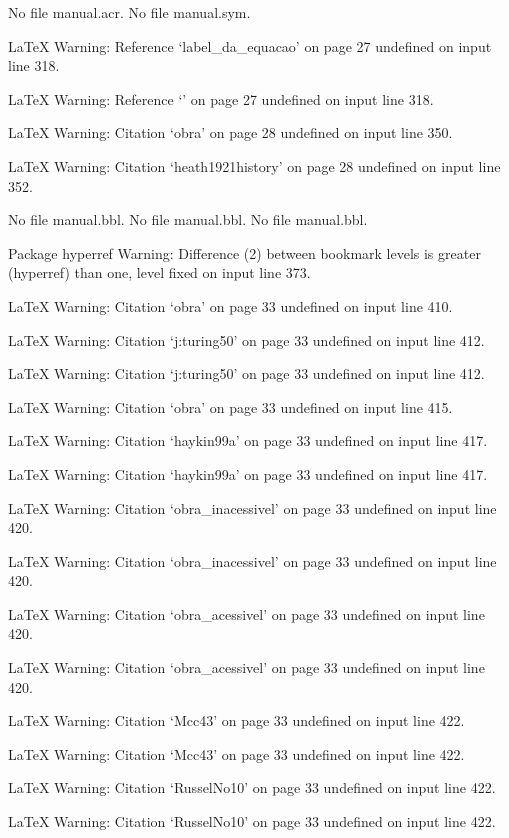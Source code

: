 





No file manual.acr.
No file manual.sym.



LaTeX Warning: Reference `label_da_equacao' on page 27 undefined on input line 318.


LaTeX Warning: Reference `' on page 27 undefined on input line 318.


LaTeX Warning: Citation `obra' on page 28 undefined on input line 350.


LaTeX Warning: Citation `heath1921history' on page 28 undefined on input line 352.

No file manual.bbl.
No file manual.bbl.
No file manual.bbl.

Package hyperref Warning: Difference (2) between bookmark levels is greater 
(hyperref)                than one, level fixed on input line 373.


LaTeX Warning: Citation `obra' on page 33 undefined on input line 410.


LaTeX Warning: Citation `j:turing50' on page 33 undefined on input line 412.


LaTeX Warning: Citation `j:turing50' on page 33 undefined on input line 412.


LaTeX Warning: Citation `obra' on page 33 undefined on input line 415.


LaTeX Warning: Citation `haykin99a' on page 33 undefined on input line 417.


LaTeX Warning: Citation `haykin99a' on page 33 undefined on input line 417.


LaTeX Warning: Citation `obra_inacessivel' on page 33 undefined on input line 420.


LaTeX Warning: Citation `obra_inacessivel' on page 33 undefined on input line 420.


LaTeX Warning: Citation `obra_acessivel' on page 33 undefined on input line 420.


LaTeX Warning: Citation `obra_acessivel' on page 33 undefined on input line 420.


LaTeX Warning: Citation `Mcc43' on page 33 undefined on input line 422.


LaTeX Warning: Citation `Mcc43' on page 33 undefined on input line 422.


LaTeX Warning: Citation `RusselNo10' on page 33 undefined on input line 422.


LaTeX Warning: Citation `RusselNo10' on page 33 undefined on input line 422.



